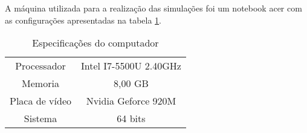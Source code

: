 A máquina utilizada para a realização das simulações foi um notebook acer com as configurações apresentadas na tabela
\ref{tab:note_config}.

\begin{table}
    \begin{center}
    \caption{Especificações do computador}
    \label{tab:note_config}
    \begin{tabular}{c c}
        \hline
        Processador & Intel I7-5500U 2.40GHz \\
        Memoria & 8,00 GB \\
        Placa de vídeo & Nvidia Geforce 920M \\
        Sistema & 64 bits \\ \hline
    \end{tabular}
    \end{center}
\end{table}
